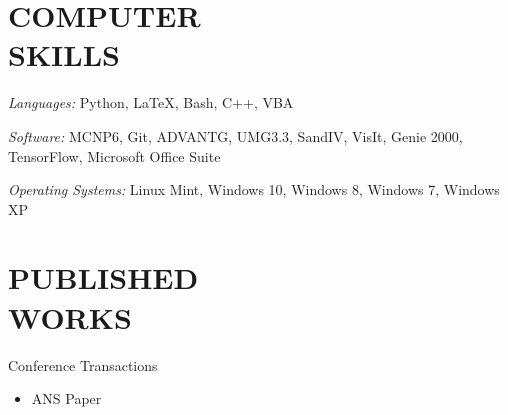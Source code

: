 \documentclass[margin, 10pt]{res} %
\begin{document}
\begin{resume}
\section{COMPUTER \\ SKILLS} 

{\sl Languages:}
Python, \LaTeX, Bash, C++, VBA

{\sl Software:}
MCNP6, Git, ADVANTG, UMG3.3, SandIV, VisIt, Genie 2000, TensorFlow, Microsoft Office Suite

{\sl Operating Systems:}
Linux Mint, Windows 10, Windows 8, Windows 7, Windows XP

\section{PUBLISHED \\ WORKS}
Conference Transactions
\begin{itemize}
\item ANS Paper
\end{itemize}


\end{resume}
\end{document}
